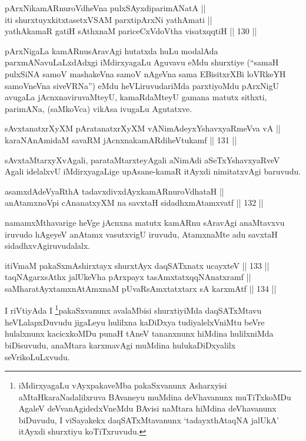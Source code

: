 \begin{shl}
pArxNikamARnuroVdheVna pulxSAyxdiparimANatA || \\
iti shurxtuyxkitxtasetxVSAM parxtipArxNi yathAmati || \\
yathAkamaR gatiH sAthxnaM pariceCxVdoV\s tha visatxqqtiH \hfill || 130 ||  
\end{shl}

\begin{artha}
pArxNigaLa kamARnusAravAgi hutatxda huLu modalAda parxmANavuLaLxdAdxgi
iMdirxyagaLu Aguvavu eMdu shurxtiye (``samaH pulxSiNA samoV mashakeVna samoV nAgeVna sama EBisitxrXBi loVRkeYH samoV\s neVna siveVRNa'') eMdu heVLiruvudariMda parxtiyoMdu pArxNigU avugaLa jAcnxnaviruvaMteyU, kamaRdaMteyU gamana
matutx sithxti, parimANa, (saMkoVca) vikAsa ivugaLu Agutatxve.
\end{artha}

\begin{shl}
sAvxtanatxrXyXM pAratanatxrXyXM vA\s NimAdeyxYshavxyaRmeVva vA || \\
karaNAnAmidaM savaRM jAcnxnakamARdiheVtukamf \hfill || 131 ||  
\end{shl}

\begin{artha}
sAvxtaMtarxyXvAgali, parataMtarxteyAgali aNimAdi aSeTxYshavxyaRveV
Agali idelalxvU iMdirxyagaLige upAsane-kamaR itAyxdi nimitatxvAgi baruvudu.
\end{artha}

\begin{shl}
asamxdAdeVyaRthA tadavxdivxdAyxkamARnuroVdhataH || \\
anAtamxnoV\s pi cA\s \s nanatxyXM na savxtaH sidadhxmAtamxvatf \hfill || 132 ||  
\end{shl}

\begin{artha}
namamxMthavarige heVge jAcnxna matutx kamARnu sAravAgi anaMtavxvu
iruvudo hAgeyeV anAtamx vasutxvigU iruvudu, AtamxnaMte adu savxtaH
sidadhxvAgiruvudalalx.
\end{artha}

\begin{shl}
itiVmaM pakaSxmAshirxtayx shurxtAyx daqSATxnatx ucayxteV \hfill || 133 || \\
taqNAgarxsAthx jalUkeVha pArxpayx tasAmxtatxqqNAnatxramf || \\
saMharatAyxtamxnA\s \s tAmxnaM pUvaRsAmxtatxtarx sA karxmAtf \hfill || 134 ||  
\end{shl}

\begin{artha}
I riVtiyAda I \footnote{iMdirxyagaLu vAyxpakaveMba pakaSxvanunx Asharxyisi
aMtaHkaraNadalilxruva BAvaneyu muMdina deVhavanunx muTiTxkoMDu AgaleV
deVvanAgidedxVneMdu BAvisi naMtara hiMdina deVhavanunx biDuvudu, I
viSayakekx daqSATxMtavanunx `tadayxthAtaqNA jalUkA' itAyxdi shurxtiyu koTiTxruvudu.}pakaSxvanunx avalaMbisi shurxtiyiMda
daqSATxMtavu heVLalapxDuvudu  jigaLeyu hulilxna kaDiDxya
tudiyalelxVniMtu beVre hulalxnunx kacicxkoMDu punaH tAneV tananxnunx
hiMdina hulilxniMda biDisuvudu, anaMtara karxmavAgi muMdina
hulukaDiDxyalilx seVrikoLuLxvudu.
\end{artha}

